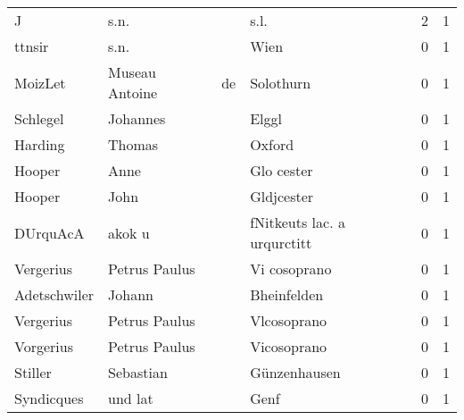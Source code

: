 \documentclass[10pt,a4paper,landscape]{article}
\begin{document}
\begin{longtable}{llllrr}
                        J &                               s.n. &             &                                        s.l. &          2 &         1 \\
                   ttnsir &                               s.n. &             &                                        Wien &          0 &         1 \\
                  MoizLet &                     Museau Antoine &          de &                                   Solothurn &          0 &         1 \\
                 Schlegel &                           Johannes &             &                                       Elggl &          0 &         1 \\
                  Harding &                             Thomas &             &                                      Oxford &          0 &         1 \\
                   Hooper &                               Anne &             &                                  Glo cester &          0 &         1 \\
                   Hooper &                               John &             &                                  Gldjcester &          0 &         1 \\
                 DUrquAcA &                             akok u &             &                 fNitkeuts lac. a urqurctitt &          0 &         1 \\
                Vergerius &                      Petrus Paulus &             &                                Vi cosoprano &          0 &         1 \\
             Adetschwiler &                             Johann &             &                                 Bheinfelden &          0 &         1 \\
                Vergerius &                      Petrus Paulus &             &                                 Vlcosoprano &          0 &         1 \\
                Vorgerius &                      Petrus Paulus &             &                                 Vicosoprano &          0 &         1 \\
                  Stiller &                          Sebastian &             &                                Günzenhausen &          0 &         1 \\
               Syndicques &                            und lat &             &                                        Genf &          0 &         1 \\

\end{longtable}
\end{document}
